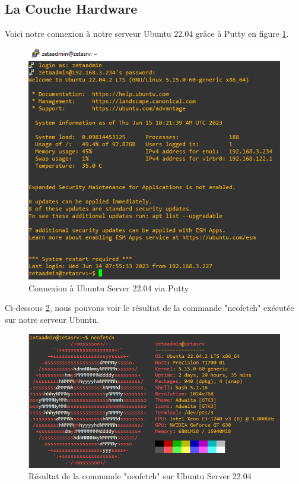 \subsection{La Couche Hardware}


Voici notre connexion à notre serveur Ubuntu 22.04 grâce à Putty en figure \ref{fig:putty-connection}. \\


\begin{figure}[H]
 \centering
    \includegraphics[width=15cm]{Images/zetaserver.png}
    \caption{Connexion à Ubuntu Server 22.04 via Putty}
    \label{fig:putty-connection}
\end{figure}

Ci-dessous \ref{fig:neofetch-result}, nous pouvons voir le résultat de la commande "neofetch" exécutée sur notre serveur Ubuntu. \\

\begin{figure}[H]
 \centering
    \includegraphics[width=15cm]{Images/neofetchzetasrv.png}
    \caption{Résultat de la commande "neofetch" sur Ubuntu Server 22.04}
    \label{fig:neofetch-result}
\end{figure}




